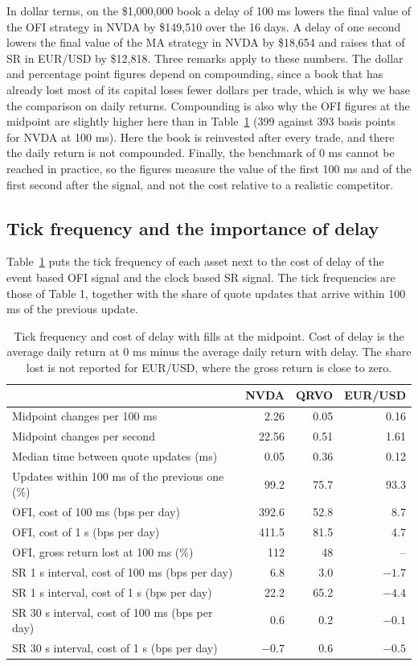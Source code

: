 \documentclass{article}
\begin{document}
\noindent In dollar terms, on the \$1,000,000 book a delay of 100 ms lowers the final value of the OFI strategy in NVDA by \$149,510 over the 16 days. A delay of one second lowers the final value of the MA strategy in NVDA by \$18,654 and raises that of SR in EUR/USD by \$12,818. Three remarks apply to these numbers. The dollar and percentage point figures depend on compounding, since a book that has already lost most of its capital loses fewer dollars per trade, which is why we base the comparison on daily returns. Compounding is also why the OFI figures at the midpoint are slightly higher here than in Table~\ref{tab:tick} (399 against 393 basis points for NVDA at 100 ms). Here the book is reinvested after every trade, and there the daily return is not compounded. Finally, the benchmark of 0 ms cannot be reached in practice, so the figures measure the value of the first 100 ms and of the first second after the signal, and not the cost relative to a realistic competitor.


\subsection{Tick frequency and the importance of delay}
Table~\ref{tab:tick} puts the tick frequency of each asset next to the cost of delay of the event based OFI signal and the clock based SR signal. The tick frequencies are those of Table 1, together with the share of quote updates that arrive within 100 ms of the previous update.
 
\begin{table}[h]
\centering
\begin{tabular}{lrrr}
\toprule
 & NVDA & QRVO & EUR/USD \\
\midrule
Midpoint changes per 100 ms & 2.26 & 0.05 & 0.16 \\
Midpoint changes per second & 22.56 & 0.51 & 1.61 \\
Median time between quote updates (ms) & 0.05 & 0.36 & 0.12 \\
Updates within 100 ms of the previous one (\%) & 99.2 & 75.7 & 93.3 \\
\midrule
OFI, cost of 100 ms (bps per day) & 392.6 & 52.8 & 8.7 \\
OFI, cost of 1 s (bps per day) & 411.5 & 81.5 & 4.7 \\
OFI, gross return lost at 100 ms (\%) & 112 & 48 & -- \\
\midrule
SR 1 s interval, cost of 100 ms (bps per day) & 6.8 & 3.0 & $-1.7$ \\
SR 1 s interval, cost of 1 s (bps per day) & 22.2 & 65.2 & $-4.4$ \\
\midrule
SR 30 s interval, cost of 100 ms (bps per day) & 0.6 & 0.2 & $-0.1$ \\
SR 30 s interval, cost of 1 s (bps per day) & $-0.7$ & 0.6 & $-0.5$ \\
\bottomrule
\end{tabular}
\caption{Tick frequency and cost of delay with fills at the midpoint. Cost of delay is the average daily return at 0 ms minus the average daily return with delay. The share lost is not reported for EUR/USD, where the gross return is close to zero.}
\label{tab:tick}
\end{table}
 
\end{document}
